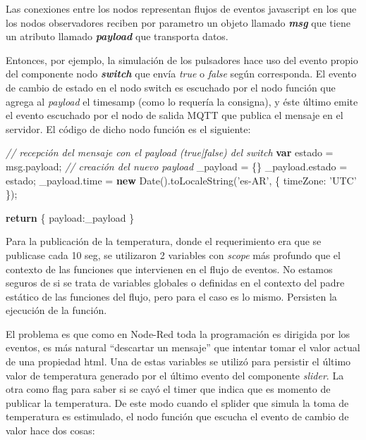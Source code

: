 \documentclass[11pt]{article}
\newenvironment{Shaded}{}{}
\newcommand{\KeywordTok}[1]{\textcolor[rgb]{0.00,0.44,0.13}{\textbf{{#1}}}}
\newcommand{\DataTypeTok}[1]{\textcolor[rgb]{0.56,0.13,0.00}{{#1}}}
\newcommand{\StringTok}[1]{\textcolor[rgb]{0.25,0.44,0.63}{{#1}}}
\newcommand{\CommentTok}[1]{\textcolor[rgb]{0.38,0.63,0.69}{\textit{{#1}}}}
\newcommand{\NormalTok}[1]{{#1}}
\newcommand{\VariableTok}[1]{\textcolor[rgb]{0.10,0.09,0.49}{{#1}}}
\newcommand{\ControlFlowTok}[1]{\textcolor[rgb]{0.00,0.44,0.13}{\textbf{{#1}}}}
\newcommand{\OperatorTok}[1]{\textcolor[rgb]{0.40,0.40,0.40}{{#1}}}
\newcommand{\AttributeTok}[1]{\textcolor[rgb]{0.49,0.56,0.16}{{#1}}}
\begin{document}
    Las conexiones entre los nodos representan flujos de eventos javascript
en los que los nodos observadores reciben por parametro un objeto
llamado \textbf{\emph{msg}} que tiene un atributo llamado
\textbf{\emph{payload}} que transporta datos.

Entonces, por ejemplo, la simulación de los pulsadores hace uso del
evento propio del componente nodo \textbf{\emph{switch}} que envía
\emph{true} o \emph{false} según corresponda. El evento de cambio de
estado en el nodo switch es escuchado por el nodo función que agrega al
\emph{payload} el timesamp (como lo requería la consigna), y éste último
emite el evento escuchado por el nodo de salida MQTT que publica el
mensaje en el servidor. El código de dicho nodo función es el siguiente:

\begin{Shaded}
\begin{Highlighting}[]
\CommentTok{// recepción del mensaje con el payload (true|false) del switch}
\KeywordTok{var}\NormalTok{ estado }\OperatorTok{=} \VariableTok{msg}\NormalTok{.}\AttributeTok{payload}\OperatorTok{;}
\CommentTok{// creación del nuevo payload}
\NormalTok{_payload }\OperatorTok{=} \OperatorTok{\{\}}
\VariableTok{_payload}\NormalTok{.}\AttributeTok{estado} \OperatorTok{=}\NormalTok{ estado}\OperatorTok{;}
\VariableTok{_payload}\NormalTok{.}\AttributeTok{time} \OperatorTok{=} \KeywordTok{new} \AttributeTok{Date}\NormalTok{().}\AttributeTok{toLocaleString}\NormalTok{(}\StringTok{'es-AR'}\OperatorTok{,} \OperatorTok{\{} \DataTypeTok{timeZone}\OperatorTok{:} \StringTok{'UTC'} \OperatorTok{\}}\NormalTok{)}\OperatorTok{;}

\ControlFlowTok{return} \OperatorTok{\{}
    \DataTypeTok{payload}\OperatorTok{:}\NormalTok{_payload   }
\OperatorTok{\}}
\end{Highlighting}
\end{Shaded}

Para la publicación de la temperatura, donde el requerimiento era que se
publicase cada 10 seg, se utilizaron 2 variables con \emph{scope} más
profundo que el contexto de las funciones que intervienen en el flujo de
eventos. No estamos seguros de si se trata de variables globales o
definidas en el contexto del padre estático de las funciones del flujo,
pero para el caso es lo mismo. Persisten la ejecución de la función.

El problema es que como en Node-Red toda la programación es dirigida por
los eventos, es más natural ``descartar un mensaje'' que intentar tomar
el valor actual de una propiedad html. Una de estas variables se utilizó
para persistir el último valor de temperatura generado por el último
evento del componente \emph{slider}. La otra como flag para saber si se
cayó el timer que indica que es momento de publicar la temperatura. De
este modo cuando el splider que simula la toma de temperatura es
estimulado, el nodo función que escucha el evento de cambio de valor
hace dos cosas:
\end{document}
